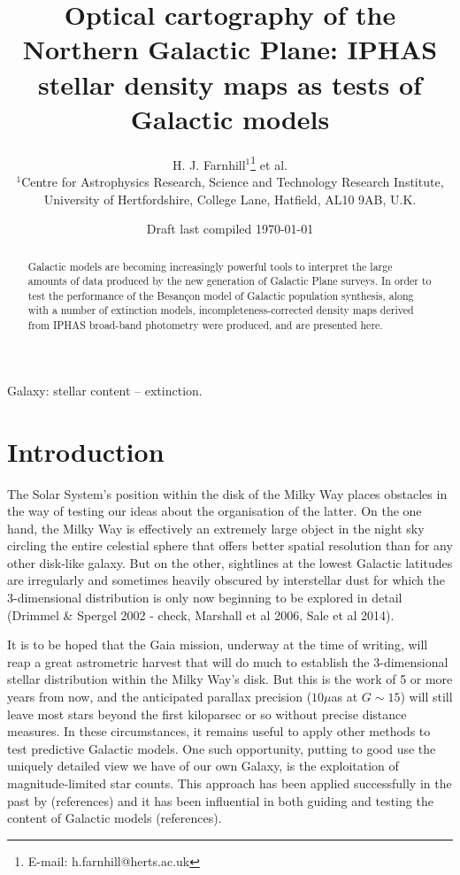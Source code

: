 \documentclass[a4paper,useAMS,usenatbib]{mn2e}
\title[Optical cartography of the Northern Galactic Plane]{Optical cartography 
of the Northern Galactic Plane: IPHAS stellar density maps as tests of Galactic models}
\author[H. J. Farnhill et al.]{H. J. Farnhill$^{1}$\thanks{E-mail:
h.farnhill@herts.ac.uk} et al.
\\
$^{1}$Centre for Astrophysics Research, Science and Technology Research Institute, University of Hertfordshire, College Lane, Hatfield, AL10 9AB, U.K.}
\begin{document}
\date{Draft last compiled \today}

\pagerange{\pageref{firstpage}--\pageref{lastpage}} 

\maketitle

\label{firstpage}

\begin{abstract}
Galactic models are becoming increasingly powerful tools to interpret the 
large amounts of data produced by the new generation of Galactic Plane 
surveys. In order to test the performance of the Besan\c{c}on model of 
Galactic population synthesis, along with a number of extinction models, 
incompleteness-corrected density maps derived from IPHAS broad-band photometry 
were produced, and are presented here.
\end{abstract}

\begin{keywords}
Galaxy: stellar content -- extinction.
\end{keywords}

\section{Introduction}
The Solar System's position within the disk of the Milky
Way places obstacles in the way of testing our ideas about the organisation of 
the latter.  On the one hand, the Milky Way is effectively an extremely large 
object in the night sky circling the entire celestial sphere that offers better 
spatial resolution than for any other disk-like galaxy. But on the other, sightlines 
at the lowest Galactic latitudes are irregularly and sometimes heavily 
obscured by interstellar dust for which the 3-dimensional distribution is 
only now beginning to be explored in detail (Drimmel \& Spergel 2002 - check, 
Marshall et al 2006, Sale et al 2014).  

It is to be hoped that the Gaia 
mission, underway at the time of writing, will reap a great astrometric 
harvest that will do much to establish the 3-dimensional stellar 
distribution within the Milky Way's disk.  But this is the work of 5 or 
more years from now, and the anticipated parallax precision ($10\mu$as at 
$G \sim 15$) will still leave most stars beyond the first kiloparsec or so 
without precise distance measures.  In these circumstances, it remains useful 
to apply other methods to test predictive Galactic models.  One such 
opportunity, putting to good use the uniquely detailed view we have of our 
own Galaxy, is the exploitation of magnitude-limited star counts.  This 
approach has been applied successfully in the past by (references) and it 
has been influential in both guiding and testing the content of Galactic 
models (references).  
\end{document}
